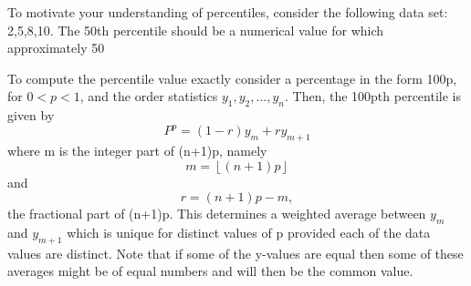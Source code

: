 \documentclass[10pt,]{book}
\theoremstyle{plain}
\theoremstyle{definition}
\theoremstyle{definition}
\numberwithin{equation}{section}
\newcommand{\lt}{ < }
\begin{document}
	To motivate your understanding of percentiles, consider the following data set: {2,5,8,10}. The 50th percentile should be a numerical value for which approximately 50%
\par
To compute the percentile value exactly consider a percentage in the form 100p, for \(0 \lt p \lt 1\), and the order statistics \(y_1, y_2, ..., y_n\). Then, the 100pth percentile is given by \begin{equation*}P^{p} = (1-r)y_m + ry_{m+1}\end{equation*}
	where m is the integer part of (n+1)p, namely \begin{equation*}m = \left\lfloor (n+1)p \right\rfloor
	\end{equation*} 
	and 
	\begin{equation*}r = (n+1)p - m,\end{equation*}
	the fractional part of (n+1)p.  This determines a weighted average between \(y_m\) and \(y_{m+1}\) which is unique for distinct values of p provided each of the data values are distinct. Note that if some of the y-values are equal then some of these averages might be of equal numbers and will then be the common value.%
\end{document}

